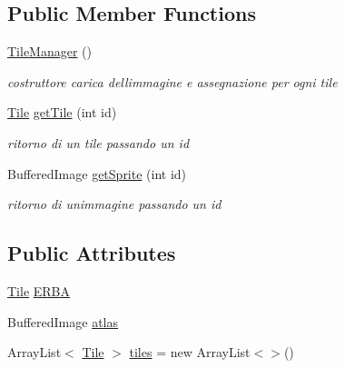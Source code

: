 \subsection*{Public Member Functions}
\begin{DoxyCompactItemize}
\item 
\hyperlink{classmanagers_1_1_tile_manager_a041c1b12a4eb5574dfedf0af6393c014}{Tile\+Manager} ()
\begin{DoxyCompactList}\small\item\em costruttore carica dell\textquotesingle{}immagine e assegnazione per ogni tile \end{DoxyCompactList}\item 
\hyperlink{classobjects_1_1_tile}{Tile} \hyperlink{classmanagers_1_1_tile_manager_a1855b58fdbe502789d9c14ee0deffb9e}{get\+Tile} (int id)
\begin{DoxyCompactList}\small\item\em ritorno di un tile passando un id \end{DoxyCompactList}\item 
Buffered\+Image \hyperlink{classmanagers_1_1_tile_manager_a46ebd32c7ec4ac506010fe465687bdd7}{get\+Sprite} (int id)
\begin{DoxyCompactList}\small\item\em ritorno di un\textquotesingle{}immagine passando un id \end{DoxyCompactList}\end{DoxyCompactItemize}
\subsection*{Public Attributes}
\begin{DoxyCompactItemize}
\item 
\hyperlink{classobjects_1_1_tile}{Tile} \hyperlink{classmanagers_1_1_tile_manager_a976f8123c1fc10e66de7e7f98570d45a}{E\+R\+BA}
\item 
Buffered\+Image \hyperlink{classmanagers_1_1_tile_manager_a0f6db27994c397bfb9bb56d539707c02}{atlas}
\item 
Array\+List$<$ \hyperlink{classobjects_1_1_tile}{Tile} $>$ \hyperlink{classmanagers_1_1_tile_manager_a4b6ed1e7aa1fffacfc6271483b48c304}{tiles} = new Array\+List$<$$>$()
\end{DoxyCompactItemize}
